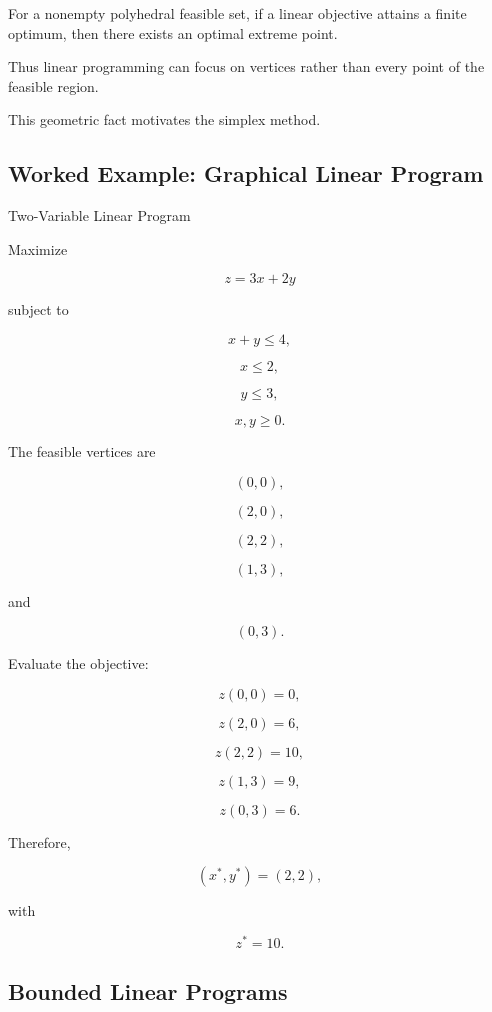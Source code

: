 For a nonempty polyhedral feasible set, if a linear objective attains a
finite optimum, then there exists an optimal extreme point.

Thus linear programming can focus on vertices rather than every point of
the feasible region.

This geometric fact motivates the simplex method.

\subsection{Worked Example: Graphical Linear Program}
\label{subsec:worked-graphical-lp}

\begin{workedexamplebox}{Two-Variable Linear Program}

Maximize

\[
z=3x+2y
\]

subject to

\[
x+y\leq4,
\]

\[
x\leq2,
\]

\[
y\leq3,
\]

\[
x,y\geq0.
\]

The feasible vertices are

\[
(0,0),
\]

\[
(2,0),
\]

\[
(2,2),
\]

\[
(1,3),
\]

and

\[
(0,3).
\]

Evaluate the objective:

\[
z(0,0)=0,
\]

\[
z(2,0)=6,
\]

\[
z(2,2)=10,
\]

\[
z(1,3)=9,
\]

\[
z(0,3)=6.
\]

Therefore,

\begin{answerbox}
\[
\boxed{
(x^*,y^*)=(2,2),
}
\]

with

\[
\boxed{
z^*=10.
}
\]
\end{answerbox}

\end{workedexamplebox}

\subsection{Bounded Linear Programs}
\label{subsec:bounded-linear-programs}

